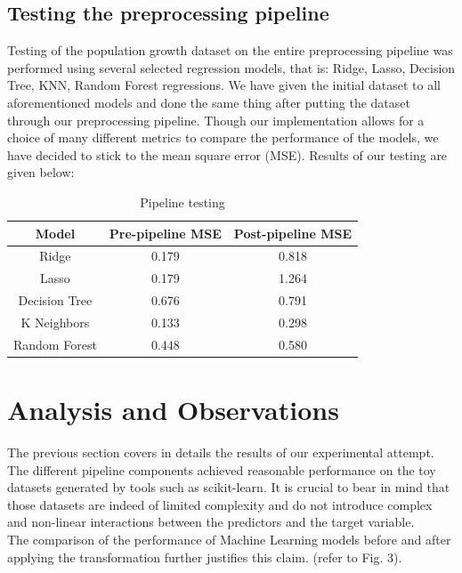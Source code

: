 \documentclass[conference]{IEEEtran}
\begin{document}
\subsection{Testing the preprocessing pipeline}

Testing of the population growth dataset on the entire preprocessing pipeline was performed using several selected regression models, that is: Ridge, Lasso, Decision Tree, KNN, Random Forest regressions. We have given the initial dataset to all aforementioned models and done the same thing after putting the dataset through our preprocessing pipeline. Though our implementation allows for a choice of many different metrics to compare the performance of the models, we have decided to stick to the mean square error (MSE). Results of our testing are given below:

\begin{table}[htbp]
	\caption{Pipeline testing}
	\begin{center}
		\begin{tabular}{|c|c|c|}
			\hline
			\textbf{Model}&\textbf{Pre-pipeline MSE}&\textbf{Post-pipeline MSE}\\
			\hline
			Ridge&0.179&0.818 \\
			\hline
			Lasso&0.179&1.264 \\
			\hline
			Decision Tree&0.676&0.791 \\
			\hline
			K Neighbors&0.133&0.298 \\
			\hline
			Random Forest&0.448&0.580 \\
			\hline
		\end{tabular}
		\label{tab1}
	\end{center}
\end{table}

\section{Analysis and Observations}

The previous section covers in details the results of our experimental attempt. The different pipeline components achieved reasonable performance on the toy datasets generated by tools such as scikit-learn. It is crucial to  bear in mind that those datasets are indeed of limited complexity and do not introduce complex and non-linear interactions between the predictors and the target variable.\\

The comparison of the performance of Machine Learning models before and after applying the transformation further justifies this claim. (refer to Fig. 3). 
\end{document}
